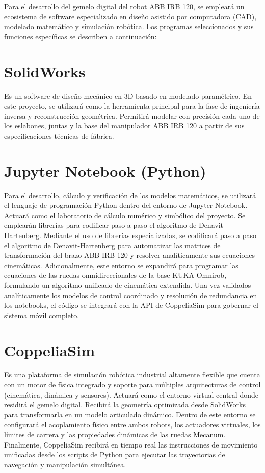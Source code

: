 \documentclass[11pt,oneside]{report}
\begin{document}
Para el desarrollo del gemelo digital del robot ABB IRB 120, se empleará un ecosistema de software especializado en diseño asistido por computadora (CAD), modelado matemático y simulación robótica. Los programas seleccionados y sus funciones específicas se describen a continuación:

\section{SolidWorks}

Es un software de diseño mecánico en 3D basado en modelado paramétrico. En este proyecto, se utilizará como la herramienta principal para la fase de ingeniería inversa y reconstrucción geométrica. Permitirá modelar con precisión cada uno de los eslabones, juntas y la base del manipulador ABB IRB 120 a partir de sus especificaciones técnicas de fábrica.

\section{Jupyter Notebook (Python)}

Para el desarrollo, cálculo y verificación de los modelos matemáticos, se utilizará el lenguaje de programación Python dentro del entorno de Jupyter Notebook. Actuará como el laboratorio de cálculo numérico y simbólico del proyecto. Se emplearán librerías para codificar paso a paso el algoritmo de Denavit-Hartenberg. Mediante el uso de librerías especializadas, se codificará paso a paso el algoritmo de Denavit-Hartenberg para automatizar las matrices de transformación del brazo ABB IRB 120 y resolver analíticamente sus ecuaciones cinemáticas. Adicionalmente, este entorno se expandirá para programar las ecuaciones de las ruedas omnidireccionales de la base KUKA Omnirob, formulando un algoritmo unificado de cinemática extendida. Una vez validados analíticamente los modelos de control coordinado y resolución de redundancia en los notebooks, el código se integrará con la API de CoppeliaSim para gobernar el sistema móvil completo.

\section{CoppeliaSim}

Es una plataforma de simulación robótica industrial altamente flexible que cuenta con un motor de física integrado y soporte para múltiples arquitecturas de control (cinemática, dinámica y sensores). Actuará como el entorno virtual central donde residirá el gemelo digital. Recibirá la geometría optimizada desde SolidWorks para transformarla en un modelo articulado dinámico. Dentro de este entorno se configurará el acoplamiento físico entre ambos robots, los actuadores virtuales, los límites de carrera y las propiedades dinámicas de las ruedas Mecanum. Finalmente, CoppeliaSim recibirá en tiempo real las instrucciones de movimiento unificadas desde los scripts de Python para ejecutar las trayectorias de navegación y manipulación simultánea.
\end{document}
